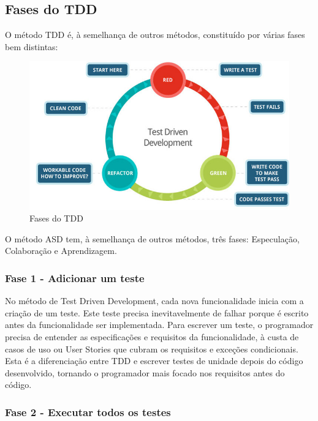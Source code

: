 \subsection{Fases do TDD}

O método TDD é, à semelhança de outros métodos, constituído por várias fases bem distintas:

\begin{figure}[H]
    \centering
    \includegraphics[scale=0.8]{Imagens/stride-nyc-test-driven-development-chart-700x400.jpg}
    \caption{Fases do TDD}
    \label{fig:tdd1}
\end{figure}


O método ASD tem, à semelhança de outros métodos, três fases: Especulação, Colaboração e Aprendizagem.

\subsubsection{Fase 1 - Adicionar um teste}

No método de Test Driven Development, cada nova funcionalidade inicia com a criação de um teste. Este teste precisa inevitavelmente de falhar porque é escrito antes da funcionalidade ser implementada. Para escrever um teste, o programador precisa de entender as especificações e requisitos da funcionalidade, à custa de casos de uso ou User Stories que cubram os requisitos e exceções condicionais. Esta é a diferenciação entre TDD e escrever testes de unidade depois do código desenvolvido, tornando o programador mais focado nos requisitos antes do código.

\subsubsection{Fase 2 - Executar todos os testes}

